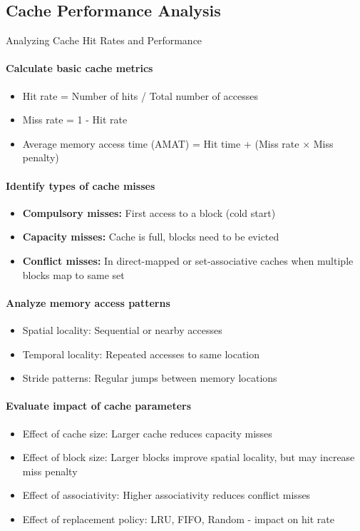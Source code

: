 \subsection{Cache Performance Analysis}

\begin{KR}{Analyzing Cache Hit Rates and Performance}
\paragraph{Calculate basic cache metrics}
\begin{itemize}
    \item Hit rate = Number of hits / Total number of accesses
    \item Miss rate = 1 - Hit rate
    \item Average memory access time (AMAT) = Hit time + (Miss rate × Miss penalty)
\end{itemize}

\paragraph{Identify types of cache misses}
\begin{itemize}
    \item \textbf{Compulsory misses:} First access to a block (cold start)
    \item \textbf{Capacity misses:} Cache is full, blocks need to be evicted
    \item \textbf{Conflict misses:} In direct-mapped or set-associative caches when multiple blocks map to same set
\end{itemize}

\paragraph{Analyze memory access patterns}
\begin{itemize}
    \item Spatial locality: Sequential or nearby accesses
    \item Temporal locality: Repeated accesses to same location
    \item Stride patterns: Regular jumps between memory locations
\end{itemize}

\paragraph{Evaluate impact of cache parameters}
\begin{itemize}
    \item Effect of cache size: Larger cache reduces capacity misses
    \item Effect of block size: Larger blocks improve spatial locality, but may increase miss penalty
    \item Effect of associativity: Higher associativity reduces conflict misses
    \item Effect of replacement policy: LRU, FIFO, Random - impact on hit rate
\end{itemize}
\end{KR}

